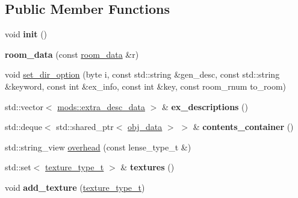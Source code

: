 \subsection*{Public Member Functions}
\begin{DoxyCompactItemize}
\item 
\mbox{\label{structroom__data_afcd0aff11a5deaeacb1b0a9a0d6d8024}} 
void {\bfseries init} ()
\item 
\mbox{\label{structroom__data_a130bb038480d990dbf2f1ae8107767b3}} 
{\bfseries room\+\_\+data} (const \hyperlink{structroom__data}{room\+\_\+data} \&r)
\item 
void \hyperlink{structroom__data_a34bca78611d71d3aaffa3c3353bd14f9}{set\+\_\+dir\+\_\+option} (byte i, const std\+::string \&gen\+\_\+desc, const std\+::string \&keyword, const int \&ex\+\_\+info, const int \&key, const room\+\_\+rnum to\+\_\+room)
\item 
\mbox{\label{structroom__data_ab4f6133ecc1bd1d75ae511a151dba79a}} 
std\+::vector$<$ \hyperlink{structmods_1_1extra__desc__data}{mods\+::extra\+\_\+desc\+\_\+data} $>$ \& {\bfseries ex\+\_\+descriptions} ()
\item 
\mbox{\label{structroom__data_a426dcc56f86e2a6c6351cd10554e4d81}} 
std\+::deque$<$ std\+::shared\+\_\+ptr$<$ \hyperlink{structobj__data}{obj\+\_\+data} $>$ $>$ \& {\bfseries contents\+\_\+container} ()
\item 
std\+::string\+\_\+view \hyperlink{structroom__data_a2884a2a31feeab08c7e495453e354261}{overhead} (const lense\+\_\+type\+\_\+t \&)
\item 
\mbox{\label{structroom__data_ae6b8b5bfe7d756defe8449474d980b37}} 
std\+::set$<$ \hyperlink{structroom__data_a9552b46091ee649079e41f04f9543b8e}{texture\+\_\+type\+\_\+t} $>$ \& {\bfseries textures} ()
\item 
\mbox{\label{structroom__data_ab920d34ccdc9ee2410d21e3c662d3b13}} 
void {\bfseries add\+\_\+texture} (\hyperlink{structroom__data_a9552b46091ee649079e41f04f9543b8e}{texture\+\_\+type\+\_\+t})
\item 
\mbox{\label{structroom__data_a20fdff584e4dcf7aca035408f89ce584}} 

\end{DoxyCompactItemize}
